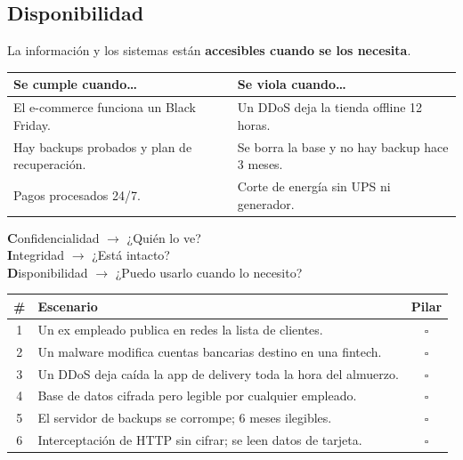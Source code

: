 \documentclass[12pt,a4paper]{article}
\newcommand{\checkboxVacio}{$\square$\;}
\begin{document}
\subsection{Disponibilidad \;\textrm{\Large\clock}}
\begin{cajaDefinicion}
La información y los sistemas están \textbf{accesibles cuando se los necesita}.
\end{cajaDefinicion}

\begin{table}[h!]
\centering
\begin{tabularx}{\textwidth}{XX}
\toprule
\textbf{Se cumple cuando\ldots} & \textbf{Se viola cuando\ldots} \\
\midrule
El e-commerce funciona un Black Friday. &
Un DDoS deja la tienda offline 12 horas. \\[4pt]
Hay backups probados y plan de recuperación. &
Se borra la base y no hay backup hace 3 meses. \\[4pt]
Pagos procesados 24/7. &
Corte de energía sin UPS ni generador. \\
\bottomrule
\end{tabularx}
\end{table}

\begin{tcolorbox}[colback=doradoUCA!10, colframe=doradoUCA, title=Regla mnemotécnica, arc=3mm]
\begin{center}
\textbf{C}onfidencialidad $\rightarrow$ ¿Quién lo ve?\\[4pt]
\textbf{I}ntegridad $\rightarrow$ ¿Está intacto?\\[4pt]
\textbf{D}isponibilidad $\rightarrow$ ¿Puedo usarlo cuando lo necesito?
\end{center}
\end{tcolorbox}

\begin{cajaActividad}[title={\ding{45}\; Ejercicio rápido — Marcá con C, I o D}]
\vspace{4pt}
\renewcommand{\arraystretch}{1.8}
\begin{tabularx}{\textwidth}{|c|X|c|}
\hline
\textbf{\#} & \textbf{Escenario} & \textbf{Pilar} \\
\hline
1 & Un ex empleado publica en redes la lista de clientes. & \checkboxVacio \\
\hline
2 & Un malware modifica cuentas bancarias destino en una fintech. & \checkboxVacio \\
\hline
3 & Un DDoS deja caída la app de delivery toda la hora del almuerzo. & \checkboxVacio \\
\hline
4 & Base de datos cifrada pero legible por cualquier empleado. & \checkboxVacio \\
\hline
5 & El servidor de backups se corrompe; 6 meses ilegibles. & \checkboxVacio \\
\hline
6 & Interceptación de HTTP sin cifrar; se leen datos de tarjeta. & \checkboxVacio \\
\hline
\end{tabularx}
\end{cajaActividad}
\end{document}
